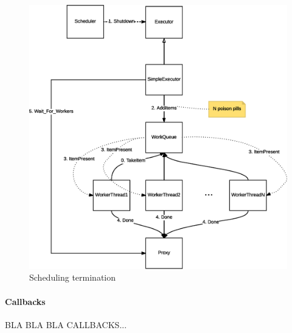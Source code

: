 \begin{figure}[H]
\centering
\includegraphics[scale=0.5,keepaspectratio]{images/solution/app/backend/scheduling-termination.eps}
\caption{Scheduling termination}
\label{fig:schedule-termination}
\end{figure}

\paragraph{Callbacks}

BLA BLA BLA CALLBACKS...
